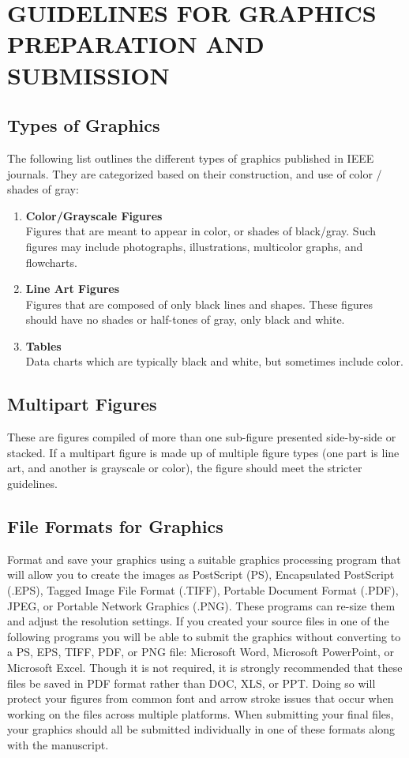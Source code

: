 \documentclass[correspondence]{IEEEtaes}
\begin{document}
\section{GUIDELINES FOR GRAPHICS PREPARATION AND SUBMISSION}

\subsection{Types of Graphics}

The following list outlines the different types of graphics published in IEEE journals. They are categorized based on their construction, and use of color / shades of gray:

\begin{enumerate}
\def\labelenumi{\arabic{enumi})}
\item
  \textbf{Color/Grayscale Figures}\\
  Figures that are meant to appear in color, or shades of black/gray. Such figures may include photographs, illustrations, multicolor graphs, and flowcharts.
\item
  \textbf{Line Art Figures}\\
  Figures that are composed of only black lines and shapes. These figures should have no shades or half-tones of gray, only black and white.
\item
  \textbf{Tables}\\
  Data charts which are typically black and white, but sometimes include color.
\end{enumerate}

\subsection{Multipart Figures}

These are figures compiled of more than one sub-figure presented side-by-side or stacked. If a multipart figure is made up of multiple figure types (one part is line art, and another is grayscale or color), the figure should meet the stricter guidelines.

\subsection{File Formats for Graphics}

Format and save your graphics using a suitable graphics processing program that will allow you to create the images as PostScript (PS), Encapsulated PostScript (.EPS), Tagged Image File Format (.TIFF), Portable Document Format (.PDF), JPEG, or Portable Network Graphics (.PNG). These programs can re-size them and adjust the resolution settings. If you created your source files in one of the following programs you will be able to submit the graphics without converting to a PS, EPS, TIFF, PDF, or PNG file: Microsoft Word, Microsoft PowerPoint, or Microsoft Excel. Though it is not required, it is strongly recommended that these files be saved in PDF format rather than DOC, XLS, or PPT. Doing so will protect your figures from common font and arrow stroke issues that occur when working on the files across multiple platforms. When submitting your final files, your graphics should all be submitted individually in one of these formats along with the manuscript.
\end{document}
